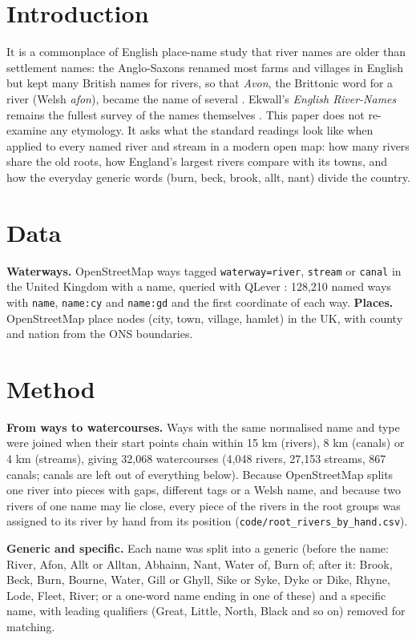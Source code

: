 \documentclass[11pt,a4paper]{article}
\begin{document}
\section{Introduction}
It is a commonplace of English place-name study that river names are older than settlement names: the Anglo-Saxons renamed most farms and villages in English but kept many British names for rivers, so that \textit{Avon}, the Brittonic word for a river (Welsh \textit{afon}), became the name of several \citep{ekwall1928,gelling2000,mills2011}. Ekwall's \textit{English River-Names} remains the fullest survey of the names themselves \citep{ekwall1928}. This paper does not re-examine any etymology. It asks what the standard readings look like when applied to every named river and stream in a modern open map: how many rivers share the old roots, how England's largest rivers compare with its towns, and how the everyday generic words (burn, beck, brook, allt, nant) divide the country.

\section{Data}
\textbf{Waterways.} OpenStreetMap ways tagged \texttt{waterway=river}, \texttt{stream} or \texttt{canal} in the United Kingdom with a name, queried with QLever \citep{bast2017}: 128,210 named ways with \texttt{name}, \texttt{name:cy} and \texttt{name:gd} and the first coordinate of each way. \textbf{Places.} OpenStreetMap place nodes (city, town, village, hamlet) in the UK, with county and nation from the ONS boundaries.

\section{Method}
\textbf{From ways to watercourses.} Ways with the same normalised name and type were joined when their start points chain within 15 km (rivers), 8 km (canals) or 4 km (streams), giving 32,068 watercourses (4,048 rivers, 27,153 streams, 867 canals; canals are left out of everything below). Because OpenStreetMap splits one river into pieces with gaps, different tags or a Welsh name, and because two rivers of one name may lie close, every piece of the rivers in the root groups was assigned to its river by hand from its position (\texttt{code/root\_rivers\_by\_hand.csv}).

\textbf{Generic and specific.} Each name was split into a generic (before the name: River, Afon, Allt or Alltan, Abhainn, Nant, Water of, Burn of; after it: Brook, Beck, Burn, Bourne, Water, Gill or Ghyll, Sike or Syke, Dyke or Dike, Rhyne, Lode, Fleet, River; or a one-word name ending in one of these) and a specific name, with leading qualifiers (Great, Little, North, Black and so on) removed for matching.
\end{document}
